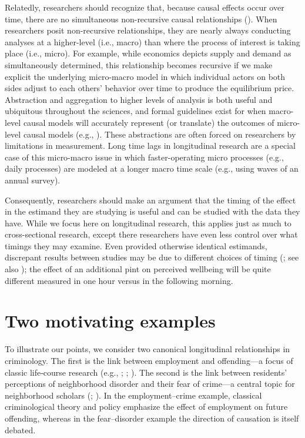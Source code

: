 \documentclass[
  letterpaper,
  DIV=11,
  numbers=noendperiod]{scrartcl}
\begin{document}
Relatedly, researchers should recognize that, because causal effects
occur over time, there are no simultaneous non-recursive causal
relationships (). When researchers posit non-recursive relationships, they are
nearly always conducting analyses at a higher-level (i.e., macro) than
where the process of interest is taking place (i.e., micro). For
example, while economics depicts supply and demand as simultaneously
determined, this relationship becomes recursive if we make explicit the
underlying micro-macro model in which individual actors on both sides
adjust to each others' behavior over time to produce the equilibrium
price. Abstraction and aggregation to higher levels of analysis is both
useful and ubiquitous throughout the sciences, and formal guidelines
exist for when macro-level causal models will accurately represent (or
translate) the outcomes of micro-level causal models (e.g.,
). These
abstractions are often forced on researchers by limitations in
measurement. Long time lags in longitudinal research are a special case
of this micro-macro issue in which faster-operating micro processes
(e.g., daily processes) are modeled at a longer macro time scale (e.g.,
using waves of an annual survey).

Consequently, researchers should make an argument that the timing of the
effect in the estimand they are studying is useful and can be studied
with the data they have. While we focus here on longitudinal research,
this applies just as much to cross-sectional research, except there
researchers have even less control over what timings they may examine.
Even provided otherwise identical estimands, discrepant results between
studies may be due to different choices of timing
(; see also
); the effect of an
additional pint on perceived wellbeing will be quite different measured
in one hour versus in the following morning.

\section{Two motivating examples}\label{two-motivating-examples}

To illustrate our points, we consider two canonical longitudinal
relationships in criminology. The first is the link between employment
and offending---a focus of classic life‐course research (e.g.,
;
;
). The second is the
link between residents' perceptions of neighborhood disorder and their
fear of crime---a central topic for neighborhood scholars
(;
). In
the employment--crime example, classical criminological theory and
policy emphasize the effect of employment on future offending, whereas
in the fear--disorder example the direction of causation is itself
debated.
\end{document}
